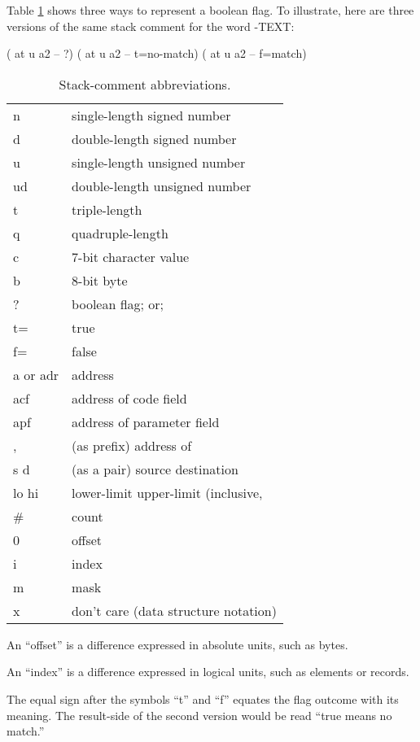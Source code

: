 Table \ref{tab-5-2} shows three ways to represent a boolean flag.  To
illustrate, here are three versions of the same stack comment for the
word -TEXT: 
\begin{Code}
( at u a2 -- ?)
( at u a2 -- t=no-match)
( at u a2 -- f=match)
\end{Code}
\begin{table}[tttt]
\caption{Stack-comment abbreviations.}
\label{tab-5-2}
\vspace{1ex}
\blackline{1ex}
\begin{tabular}{@{\hspace{2.5em}}ll}
n             &  single-length signed number \\
d             &  double-length signed number \\
u             &  single-length unsigned number \\
ud            &  double-length unsigned number \\
t             &  triple-length \\
q             &  quadruple-length \\
c             &  7-bit character value \\
b             &  8-bit byte \\
?             &  boolean flag; or; \\
\quad t=         &  true \\
\quad f=         &  false \\
a or adr      &  address \\
acf           &  address of code field \\
apf           &  address of parameter field \\
,             &  (as prefix) address of \\
s d           &  (as a pair) source destination \\
lo hi         &  lower-limit upper-limit (inclusive, \\
\#            &   count \\
0             &  offset \\
i             &  index \\
m             &  mask \\
x             &  don't care (data structure notation) \\
\end{tabular}
\bigskip

An ``offset'' is a difference expressed in absolute units, such as bytes.

An ``index'' is a difference expressed in logical units, such as elements or records.
\vspace{0ex}
\blackline{0ex}
\end{table}
The equal sign after the symbols ``t'' and ``f'' equates the flag outcome
with its meaning.  The result-side of the second version would be read
``true means no match.''


